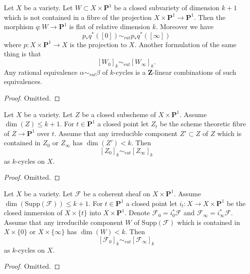 \begin{lemma}
\label{lemma-rational-equivalence-family}
Let $X$ be a variety.
Let $W \subset X \times \mathbf{P}^1$ be a closed subvariety
of dimension $k + 1$ which is not contained in a fibre of
the projection $X \times \mathbf{P}^1 \to \mathbf{P}^1$.
Then the morphism $q : W \to \mathbf{P}^1$ is flat of relative dimension $k$.
Moreover we have
$$
p_*q^*([0]) \sim_{rat} p_*q^*([\infty])
$$
where $p : X \times \mathbf{P}^1 \to X$ is the projection to $X$.
Another formulation of the same thing is that
$$
[W_0]_k \sim_{rat} [W_\infty]_k.
$$
Any rational equivalence $\alpha \sim_{rat} \beta$ of $k$-cycles is a
$\mathbf{Z}$-linear combinations of such equivalences.
\end{lemma}

\begin{proof}
Omitted.
\end{proof}

\begin{lemma}
\label{lemma-closed-subscheme-cross-p1}
Let $X$ be a variety.
Let $Z$ be a closed subscheme of $X \times \mathbf{P}^1$.
Assume $\dim(Z) \leq k + 1$. For $t \in \mathbf{P}^1$ a closed point
let $Z_t$ be the scheme theoretic fibre of $Z \to \mathbf{P}^1$
over $t$. Assume that any irreducible component $Z' \subset Z$
of $Z$ which is contained in $Z_0$ or $Z_\infty$ has
$\dim(Z') < k$. Then
$$
[Z_0]_k \sim_{rat} [Z_\infty]_k
$$
as $k$-cycles on $X$.
\end{lemma}

\begin{proof}
Omitted.
\end{proof}

\begin{lemma}
\label{lemma-coherent-sheaf-cross-p1}
Let $X$ be a variety.
Let $\mathcal{F}$ be a coherent sheaf on $X \times \mathbf{P}^1$.
Assume
$
\dim(\text{Supp}(\mathcal{F})) \leq k + 1.
$
For $t \in \mathbf{P}^1$ a closed point
let $i_t : X \to X \times \mathbf{P}^1$ be the closed immersion
of $X \times \{t\}$ into $X \times \mathbf{P}^1$.
Denote $\mathcal{F}_0 = i_0^*\mathcal{F}$ and
$\mathcal{F}_\infty = i_\infty^*\mathcal{F}$.
Assume that any irreducible component $W$ of $\text{Supp}(\mathcal{F})$
which is contained in $X \times \{0\}$ or $X \times \{\infty\}$ has
$\dim(W) < k$. Then
$$
[\mathcal{F}_0]_k \sim_{rat} [\mathcal{F}_\infty]_k
$$
as $k$-cycles on $X$.
\end{lemma}

\begin{proof}
Omitted.
\end{proof}

